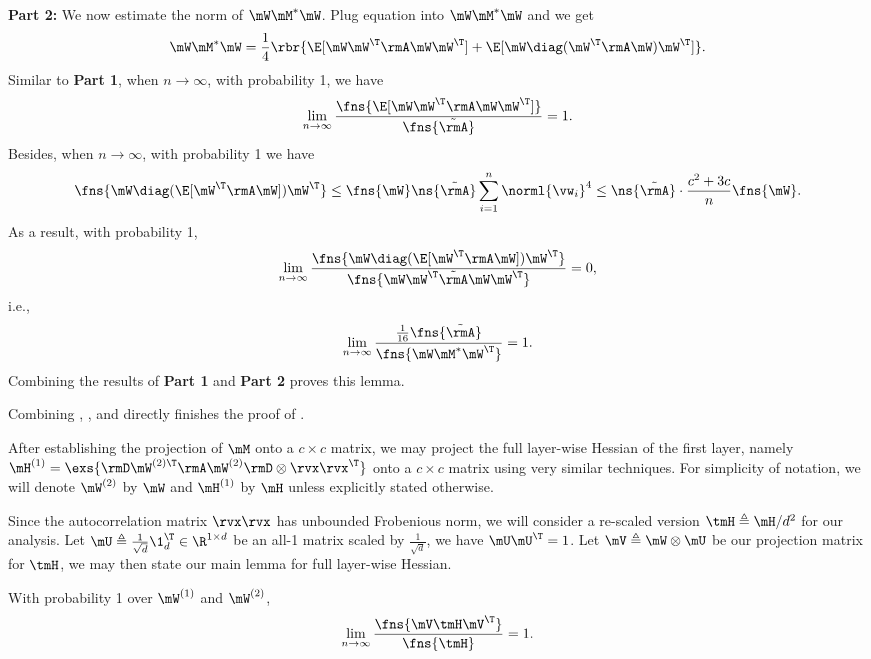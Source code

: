 \begin{proofof}{}
\begin{proofof}{}
\textbf{Part 2:} We now estimate the norm of $\mW\mM^*\mW$. Plug equation  into $\mW\mM^*\mW$ and we get
\begin{equation}
\mW\mM^*\mW = \frac14\rbr{\E[\mW\mW^\T\rmA\mW\mW^\T]+\E[\mW \diag(\mW^\T\rmA\mW)\mW^\T]}.
\end{equation}
Similar to \textbf{Part 1}, when $n\to\infty$, with probability 1, we have
\begin{equation}
\lim_{n\to\infty}\frac{\fns{\E[\mW\mW^\T\rmA\mW\mW^\T]}}{\fns{\tilde{\rmA}}} = 1.
\end{equation}
Besides, when $n\to\infty$, with probability 1 we have
\begin{equation}
\fns{\mW\diag(\E[\mW^\T\rmA\mW])\mW^\T}\leq \fns{\mW}\ns{\tilde{\rmA}}\sum_{i=1}^n \norml{\vw_i}^4\leq \ns{\tilde{\rmA}}\cdot\frac{c^2+3c}{n}\fns{\mW}.
\end{equation}
As a result, with probability 1,
\begin{equation}
\lim_{n\to\infty}\frac{\fns{\mW\diag(\E[\mW^\T\rmA\mW])\mW^\T}}{\fns{\mW\mW^\T\tilde{\rmA}\mW\mW^\T}} = 0,
\end{equation}
i.e.,
\begin{equation}
\lim_{n\to\infty}\frac{\frac{1}{16}\fns{\tilde{\rmA}}}{\fns{\mW\mM^*\mW^\T}} = 1.
\end{equation}
Combining the results of \textbf{Part 1} and \textbf{Part 2} proves this lemma.

\end{proofof}
Combining , , and  directly finishes the proof of .
\end{proofof}

After establishing the projection of $\mM$ onto a $c\times c$ matrix, we may project the full layer-wise Hessian of the first layer, namely $\mH^{(1)}=\exs{\rmD\mW^{(2)\T}\rmA\mW^{(2)}\rmD\otimes \rvx\rvx^\T}$ onto a $c\times c$ matrix using very similar techniques. For simplicity of notation, we will denote $\mW^{(2)}$ by $\mW$ and $\mH^{(1)}$ by $\mH$ unless explicitly stated otherwise.

Since the autocorrelation matrix $\rvx\rvx$
has unbounded Frobenious norm, we will consider a re-scaled version $\tmH\triangleq \mH/d^2$ for our analysis. Let $\mU\triangleq\frac{1}{\sqrt{d}}\1_d^\T\in\R^{1\times d}$ be an all-1 matrix scaled by $\frac{1}{\sqrt{d}}$, we have $\mU\mU^\T=1$. Let $\mV\triangleq \mW\otimes\mU$ be our projection matrix for $\tmH$, we may then state our main lemma for full layer-wise Hessian.
\begin{lemma}
\label{lemma:H-proj-preserve-f-norm}
With probability 1 over $\mW^{(1)}$ and $\mW^{(2)}$, \begin{equation}
    \lim_{n\to\infty}\frac{\fns{\mV\tmH\mV^\T}}{\fns{\tmH}}=1.
\end{equation}
\end{lemma}

